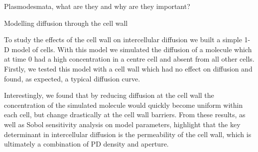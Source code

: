 \documentclass[final]{beamer}
\begin{document}
\begin{frame}{}
\begin{textblock}{28}
\begin{block}{Plasmodesmata, what are they and why are they important?}
    \end{block}

    \begin{block}{Modelling diffusion through the cell wall}

      To study the effects of the cell wall on intercellular diffusion
      we built a simple 1-D model of cells. With this model we
      simulated the diffusion of a molecule which at time 0 had a high
      concentration in a centre cell and absent from all other
      cells. Firstly, we tested this model with a cell wall which had
      no effect on diffusion and found, as expected, a typical
      diffusion curve.

      \vspace{1cm}

      Interestingly, we found that by reducing diffusion at the cell
      wall the concentration of the simulated molecule would quickly
      become uniform within each cell, but change drastically at the
      cell wall barriers. From these results, as well as Sobol
      sensitivity analysis on model parameters, highlight that the key
      determinant in intercellular diffusion is the permeability of
      the cell wall, which is ultimately a combination of PD density
      and aperture.



\end{block}
\end{textblock}
\end{frame}
\end{document}
